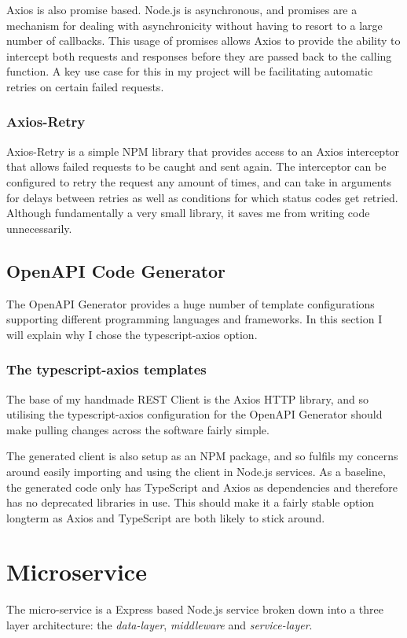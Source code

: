 Axios is also promise based. Node.js is asynchronous, and promises are a mechanism for dealing with asynchronicity without having to resort to a large number of callbacks. This usage of promises allows Axios to provide the ability to intercept both requests and responses before they are passed back to the calling function. A key use case for this in my project will be facilitating automatic retries on certain failed requests. 
\subsubsection{Axios-Retry}
Axios-Retry is a simple NPM library that provides access to an Axios interceptor that allows failed requests to be caught and sent again. The interceptor can be configured to retry the request any amount of times, and can take in arguments for delays between retries as well as conditions for which status codes get retried. Although fundamentally a very small library, it saves me from writing code unnecessarily. 

\subsection{OpenAPI Code Generator}
The OpenAPI Generator provides a huge number of template configurations supporting different programming languages and frameworks. In this section I will explain why I chose the typescript-axios option.
\subsubsection{The typescript-axios templates}
The base of my handmade REST Client is the Axios HTTP library, and so utilising the typescript-axios configuration for the OpenAPI Generator should make pulling changes across the software fairly simple.

The generated client is also setup as an NPM package, and so fulfils my concerns around easily importing and using the client in Node.js services. As a baseline, the generated code only has TypeScript and Axios as dependencies and therefore has no deprecated libraries in use. This should make it a fairly stable option longterm as Axios and TypeScript are both likely to stick around. 
\section{Microservice}
The micro-service is a Express based Node.js service broken down into a three layer architecture: the \emph{data-layer}, \emph{middleware} and \emph{service-layer}.

